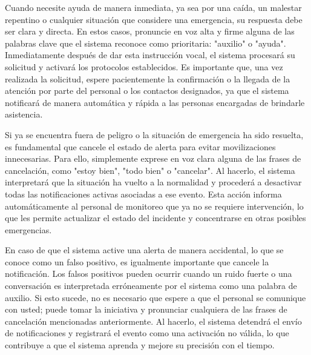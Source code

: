Cuando necesite ayuda de manera inmediata, ya sea por una caída, un malestar repentino o cualquier situación que considere una emergencia, su respuesta debe ser clara y directa. En estos casos, pronuncie en voz alta y firme alguna de las palabras clave que el sistema reconoce como prioritaria: "auxilio" o "ayuda". Inmediatamente después de dar esta instrucción vocal, el sistema procesará su solicitud y activará los protocolos establecidos. Es importante que, una vez realizada la solicitud, espere pacientemente la confirmación o la llegada de la atención por parte del personal o los contactos designados, ya que el sistema notificará de manera automática y rápida a las personas encargadas de brindarle asistencia.

Si ya se encuentra fuera de peligro o la situación de emergencia ha sido resuelta, es fundamental que cancele el estado de alerta para evitar movilizaciones innecesarias. Para ello, simplemente exprese en voz clara alguna de las frases de cancelación, como "estoy bien", "todo bien" o "cancelar". Al hacerlo, el sistema interpretará que la situación ha vuelto a la normalidad y procederá a desactivar todas las notificaciones activas asociadas a ese evento. Esta acción informa automáticamente al personal de monitoreo que ya no se requiere intervención, lo que les permite actualizar el estado del incidente y concentrarse en otras posibles emergencias.

En caso de que el sistema active una alerta de manera accidental, lo que se conoce como un falso positivo, es igualmente importante que cancele la notificación. Los falsos positivos pueden ocurrir cuando un ruido fuerte o una conversación es interpretada erróneamente por el sistema como una palabra de auxilio. Si esto sucede, no es necesario que espere a que el personal se comunique con usted; puede tomar la iniciativa y pronunciar cualquiera de las frases de cancelación mencionadas anteriormente. Al hacerlo, el sistema detendrá el envío de notificaciones y registrará el evento como una activación no válida, lo que contribuye a que el sistema aprenda y mejore su precisión con el tiempo.
